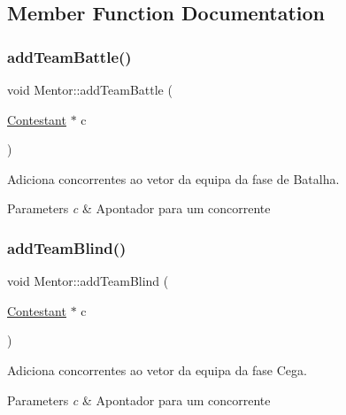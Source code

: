 \subsection{Member Function Documentation}
\hypertarget{class_mentor_a4b128fd072058b9c6255ef3984f79ddd}{}\label{class_mentor_a4b128fd072058b9c6255ef3984f79ddd} 
\subsubsection{\texorpdfstring{add\+Team\+Battle()}{addTeamBattle()}}
{\footnotesize\ttfamily void Mentor\+::add\+Team\+Battle (\begin{DoxyParamCaption}\item[{\hyperlink{class_contestant}{Contestant} $\ast$}]{c }\end{DoxyParamCaption})}



Adiciona concorrentes ao vetor da equipa da fase de Batalha. 


\begin{DoxyParams}{Parameters}
{\em c} & Apontador para um concorrente \\
\hline
\end{DoxyParams}
\hypertarget{class_mentor_a56c5c3fa81d48bc50221030e3daa22b0}{}\label{class_mentor_a56c5c3fa81d48bc50221030e3daa22b0} 
\subsubsection{\texorpdfstring{add\+Team\+Blind()}{addTeamBlind()}}
{\footnotesize\ttfamily void Mentor\+::add\+Team\+Blind (\begin{DoxyParamCaption}\item[{\hyperlink{class_contestant}{Contestant} $\ast$}]{c }\end{DoxyParamCaption})}



Adiciona concorrentes ao vetor da equipa da fase Cega. 


\begin{DoxyParams}{Parameters}
{\em c} & Apontador para um concorrente \\
\hline
\end{DoxyParams}
\hypertarget{class_mentor_a4e7d9c4b52211737d6135516d569ac52}{}\label{class_mentor_a4e7d9c4b52211737d6135516d569ac52} 
